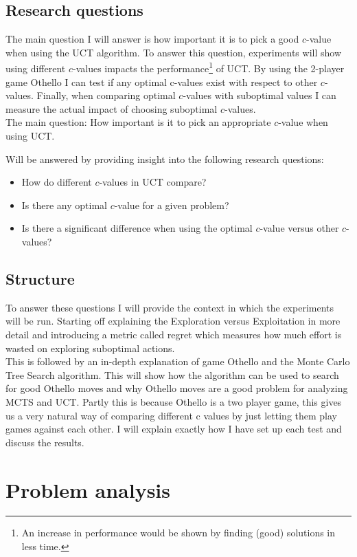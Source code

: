 \documentclass[
11pt, %
english, %
singlespacing, %
headsepline, %
]{MastersDoctoralThesis} %
\begin{document}
\section{Research questions}
\label{section:research-questions}
The main question I will answer is how important it is to pick a good $c$-value when using the UCT algorithm. To answer this question, experiments will show using different $c$-values impacts the performance\footnote{An increase in performance would be shown by finding (good) solutions in less time.} of UCT. By using the 2-player game Othello I can test if any optimal c-values exist with respect to other $c$-values. Finally, when comparing optimal $c$-values with suboptimal values I can measure the actual impact of choosing suboptimal $c$-values.\\

The main question: How important is it to pick an appropriate $c$-value when using UCT.

Will be answered by providing insight into the following research questions:
\begin{itemize}
	\item How do different $c$-values in UCT compare?
	\item Is there any optimal $c$-value for a given problem?
	\item Is there a significant difference when using the optimal $c$-value versus other $c$-values?
\end{itemize}
\section{Structure}
To answer these questions I will provide the context in which the experiments will be run. Starting off explaining the Exploration versus Exploitation in more detail and introducing a metric called regret which measures how much effort is wasted on exploring suboptimal actions.\\ This is followed by an in-depth explanation of game Othello and the Monte Carlo Tree Search algorithm. This will show how the algorithm can be used to search for good Othello moves and why Othello moves are a good problem for analyzing MCTS and UCT. Partly this is because Othello is a two player game, this gives us a very natural way of comparing different c values by just letting them play games against each other. I will explain exactly how I have set up each test and discuss the results.

\chapter{Problem analysis}
\end{document}
